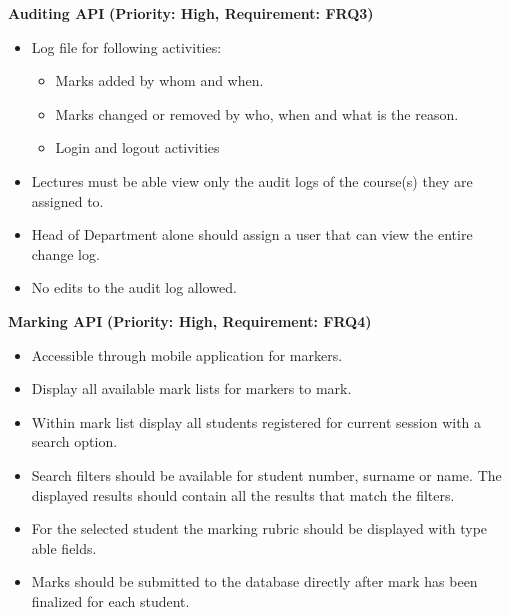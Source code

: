 \documentclass[12pt]{article}
\begin{document}
			\vspace{0.15in}
			
			\begin{flushleft}	
				\textbf{Auditing API}
				\textbf{(Priority: High, Requirement: FRQ3)}
			\end{flushleft}
			
			\vspace{0.02in}
			
			\begin{itemize}
				\item Log file for following activities:
				\begin{itemize}
				 	\item Marks added by whom and when.
				 	\item Marks changed or removed by who, when and what is the reason.
				 	\item Login and logout activities
				\end{itemize}
	
				\item Lectures must be able view only the audit logs of the course(s) they are assigned to.
				\item Head of Department alone should assign a user that can view the entire change log.
				\item No edits to the audit log allowed.
			\end{itemize}
				
			\vspace{0.15in}
				
			\begin{flushleft}
				\textbf{Marking API}
				\textbf{(Priority: High, Requirement: FRQ4)}
			\end{flushleft}
						
			\vspace{0.02in}
			
			\begin{itemize}
				\item Accessible through mobile application for markers.
				\item Display all available mark lists for markers to mark.
				\item Within mark list display all students registered for current session with a search option.
				\item Search filters should be available for student number, surname or name. The displayed results should contain all the results that match the filters.
				\item For the selected student the marking rubric should be displayed with type able fields.
				\item Marks should be submitted to the database directly after mark has been finalized for each student.
			\end{itemize}
				
\end{document}
